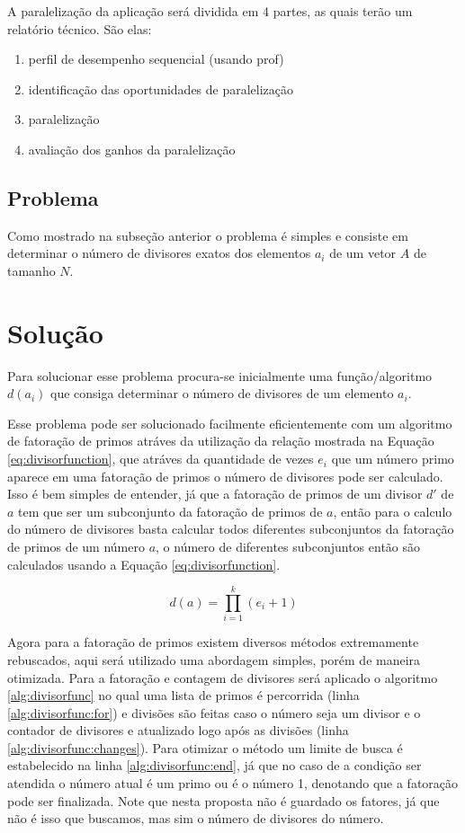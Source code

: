 \documentclass{article}
\begin{document}
A paralelização da aplicação será dividida em 4 partes, as quais terão um relatório técnico. São elas:
\begin{enumerate}
	\item perfil de desempenho sequencial (usando prof)
	\item identificação das oportunidades de paralelização
	\item paralelização
	\item avaliação dos ganhos da paralelização
\end{enumerate}

\subsection{Problema}

Como mostrado na subseção anterior o
problema é simples e consiste em determinar o número de divisores exatos dos elementos $a_i$ de um vetor $A$ de tamanho $N$.

\section{Solução}

Para solucionar esse problema procura-se inicialmente uma função/algoritmo $d(a_i)$ que consiga determinar o número de divisores de um elemento $a_i$.

Esse problema pode ser solucionado facilmente eficientemente com um algoritmo de fatoração de primos atráves da utilização da relação mostrada na Equação \ref{eq:divisorfunction}, que atráves da quantidade de vezes $e_i$ que um número primo aparece em uma fatoração de primos o número de divisores pode ser calculado. Isso é bem simples de entender, já que a fatoração de primos de um divisor $d'$ de $a$ tem que ser um subconjunto da fatoração de primos de $a$, então para o calculo do número de divisores basta calcular todos diferentes subconjuntos da fatoração de primos de um número $a$, o número de diferentes subconjuntos então são calculados usando a Equação \ref{eq:divisorfunction}.

\begin{equation}\label{eq:divisorfunction}
	d(a)=\prod_{i=1}^{k} (e_i+1)
\end{equation}

Agora para a fatoração de primos existem diversos métodos extremamente rebuscados, aqui será utilizado uma abordagem simples, porém de maneira otimizada. Para a fatoração e contagem de divisores será aplicado o algoritmo \ref{alg:divisorfunc} no qual uma lista de primos é percorrida (linha \ref{alg:divisorfunc:for}) e divisões são feitas caso o número seja um divisor e o contador de divisores e atualizado logo após as divisões (linha \ref{alg:divisorfunc:changes}). Para otimizar o método um limite de busca é estabelecido na linha \ref{alg:divisorfunc:end}, já que no caso de a condição ser atendida o número atual é um primo ou é o número 1, denotando que a fatoração pode ser finalizada. Note que nesta proposta não é guardado os fatores, já que não é isso que buscamos, mas sim o número de divisores do número.
\end{document}
